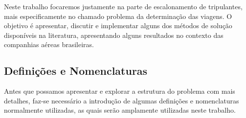 \documentclass[12pt,a4paper]{article}
\begin{document}
Neste trabalho focaremos justamente na parte de escalonamento de tripulantes, mais especificamente
no chamado problema da determinação das viagens. O objetivo é apresentar, discutir e implementar 
alguns dos métodos de solução disponíveis na literatura, apresentando alguns resultados no contexto
das companhias aéreas brasileiras.


\subsection{Definições e Nomenclaturas}
\label{sec:definicoes}

Antes que possamos apresentar e explorar a estrutura do problema com mais detalhes, faz-se
necessário a introdução de algumas definições e nomenclaturas normalmente utilizadas, as quais serão
amplamente utilizadas neste trabalho.
\end{document}
